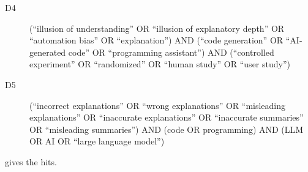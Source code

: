 \begin{description}
  \item[D4] (\enquote{illusion of understanding} OR \enquote{illusion of
    explanatory depth} OR \enquote{automation bias} OR \enquote{explanation})
    AND (\enquote{code generation} OR \enquote{AI-generated code} OR
    \enquote{programming assistant}) AND (\enquote{controlled experiment} OR
    \enquote{randomized} OR \enquote{human study} OR \enquote{user study})
  \item[D5] (\enquote{incorrect explanations} OR \enquote{wrong explanations}
    OR \enquote{misleading explanations} OR \enquote{inaccurate explanations}
    OR \enquote{inaccurate summaries} OR \enquote{misleading summaries}) AND
    (code OR programming) AND (LLM OR AI OR \enquote{large language model})
\end{description}
 gives the hits.

